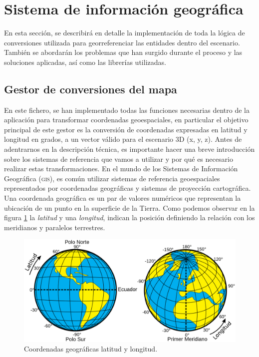 \documentclass[a4paper, 11pt]{book}
\begin{document}
\clearpage
\section{Sistema de información geográfica}
\label{sec:gis}
En esta sección, se describirá en detalle la implementación de toda la lógica de conversiones utilizada para georreferenciar las entidades dentro del escenario. También se abordarán los problemas que han surgido durante el proceso y las soluciones aplicadas, así como las librerías utilizadas.
\subsection{Gestor de conversiones del mapa}
\label{subsec:mapConversion}
En este fichero, se han implementado todas las funciones necesarias dentro de la aplicación para transformar coordenadas geoespaciales, en particular el objetivo principal de este gestor es la conversión de coordenadas expresadas en latitud y longitud en grados, a un vector válido para el escenario \gls{3D} (x, y, z).
Antes de adentrarnos en la descripción técnica, es importante hacer una breve introducción sobre los sistemas de referencia que vamos a utilizar y por qué es necesario realizar estas transformaciones.
En el mundo de los Sistemas de Información Geográfica (\textsc{\gls{gis}}), es común utilizar sistemas de referencia geoespaciales representados por coordenadas geográficas y sistemas de proyección cartográfica.
Una coordenada geográfica es un par de valores numéricos que representan la ubicación de un punto en la superficie de la Tierra. Como podemos observar en la figura \ref{fig:latlong} la \emph{latitud} y una \emph{longitud}, indican la posición definiendo la relación con los meridianos y paralelos terrestres.

\begin{figure}[h]
	\centering
	\includegraphics[width=12cm, keepaspectratio]{img/Latitud_y_Longitud_en_la_Tierra.svg.png}
	\caption{Coordenadas geográficas latitud y longitud.}
	\label{fig:latlong}
\end{figure}
\end{document}
